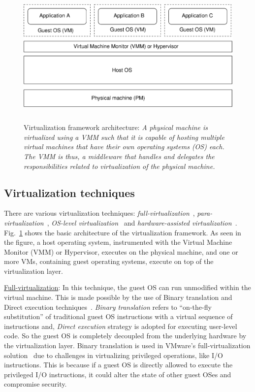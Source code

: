 \begin{figure}[t]
\begin{center}
\includegraphics[height=7cm, width=14cm]{first-aps-figures/virtualization-arch.eps}
\caption{Virtualization framework architecture: \textit{A physical machine is 
virtualized using a VMM such that it is capable of hosting multiple virtual 
machines that have their own operating systems (OS) each. The VMM is thus, a
middleware that handles and delegates the responsibilities related to virtualization
of the physical machine.}} 
\label{virtualization-arch}
\end{center}
\end{figure}

\subsection{Virtualization techniques}
\label{virtualization-tech}
There are various virtualization techniques: \textit{full-virtualization}~\cite{vmware-paravirtualization},
\textit{para-virtualization}~\cite{xen}, \textit{OS-level
virtualization}~\cite{quantifying-the-performance-isolation-properties}
and \textit{hardware-assisted virtualization}~\cite{kvm}.
Fig.~\ref{virtualization-arch} shows the basic architecture of the
virtualization framework. As seen in the figure, a host operating
system, instrumented with the 
Virtual Machine Monitor (VMM) or Hypervisor,
executes on the physical machine, 
and one or more VMs, containing guest operating systems, execute on top 
of the virtualization layer.


\underline{Full-virtualization}: In 
this technique, the guest 
OS can run unmodified within the virtual machine. This is made 
possible by the use of Binary translation and
Direct execution techniques~\cite{vmware-paravirtualization}. 
\textit{Binary translation} refers to ``on-the-fly substitution'' 
of traditional guest OS instructions with a virtual sequence of 
instructions and, \textit{Direct execution}
strategy is adopted for executing user-level code. So the
guest OS is completely decoupled from the underlying hardware by the
virtualization layer.
Binary translation is used in VMware's full-virtualization 
solution~\cite{vmware-paravirtualization} due to challenges
in virtualizing privileged operations, like I/O instructions. This is
because if a guest OS is directly allowed to execute the privileged I/O
instructions, it could alter the
state of other guest OSes and compromise security. 

